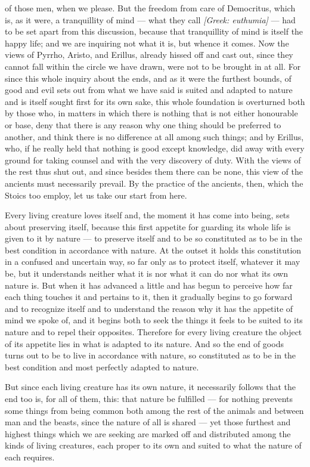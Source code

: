  of those men, when we please. But the freedom from care of Democritus, which is, as it were, a tranquillity of mind — what they call \textit{[Greek: euthumia]} — had to be set apart from this discussion, because that tranquillity of mind is itself the happy life; and we are inquiring not what it is, but whence it comes. Now the views of Pyrrho, Aristo, and Erillus, already hissed off and cast out, since they cannot fall within the circle we have drawn, were not to be brought in at all. For since this whole inquiry about the ends, and as it were the furthest bounds, of good and evil sets out from what we have said is suited and adapted to nature and is itself sought first for its own sake, this whole foundation is overturned both by those who, in matters in which there is nothing that is not either honourable or base, deny that there is any reason why one thing should be preferred to another, and think there is no difference at all among such things; and by Erillus, who, if he really held that nothing is good except knowledge, did away with every ground for taking counsel and with the very discovery of duty. With the views of the rest thus shut out, and since besides them there can be none, this view of the ancients must necessarily prevail. By the practice of the ancients, then, which the Stoics too employ, let us take our start from here.

 Every living creature loves itself and, the moment it has come into being, sets about preserving itself, because this first appetite for guarding its whole life is given to it by nature — to preserve itself and to be so constituted as to be in the best condition in accordance with nature. At the outset it holds this constitution in a confused and uncertain way, so far only as to protect itself, whatever it may be, but it understands neither what it is nor what it can do nor what its own nature is. But when it has advanced a little and has begun to perceive how far each thing touches it and pertains to it, then it gradually begins to go forward and to recognize itself and to understand the reason why it has the appetite of mind we spoke of, and it begins both to seek the things it feels to be suited to its nature and to repel their opposites. Therefore for every living creature the object of its appetite lies in what is adapted to its nature. And so the end of goods turns out to be to live in accordance with nature, so constituted as to be in the best condition and most perfectly adapted to nature.

 But since each living creature has its own nature, it necessarily follows that the end too is, for all of them, this: that nature be fulfilled — for nothing prevents some things from being common both among the rest of the animals and between man and the beasts, since the nature of all is shared — yet those furthest and highest things which we are seeking are marked off and distributed among the kinds of living creatures, each proper to its own and suited to what the nature of each requires.

